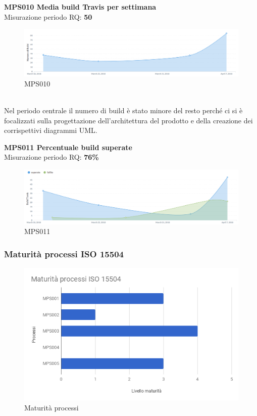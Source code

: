 \documentclass[PianoDiQualifica.tex]{subfiles}
\begin{document}
\textbf{MPS010 Media build Travis per settimana}\\
Misurazione periodo RQ: \textbf{50}
\begin{figure}[htb]
	\centering
	\includegraphics[width=1\linewidth]{RQ/MPS010}
	\caption{MPS010}
	\label{fig:processi}
\end{figure}
\\
Nel periodo centrale il numero di build è stato minore del resto perché ci si è focalizzati sulla progettazione dell'architettura del prodotto e della creazione dei corrispettivi diagrammi UML.

\newpage
\textbf{MPS011 Percentuale build superate}\\
Misurazione periodo RQ: \textbf{76\%}
\begin{figure}[htb]
	\centering
	\includegraphics[width=1\linewidth]{RQ/MPS011}
	\caption{MPS011}
	\label{fig:processi}
\end{figure}

\subsubsection{Maturità processi ISO 15504}
\begin{figure}[htbp]
	\centering
	\includegraphics[width=0.7\linewidth]{RQ/Processi}
	\caption{Maturità processi}
	\label{fig:processi}
\end{figure}
\end{document}
